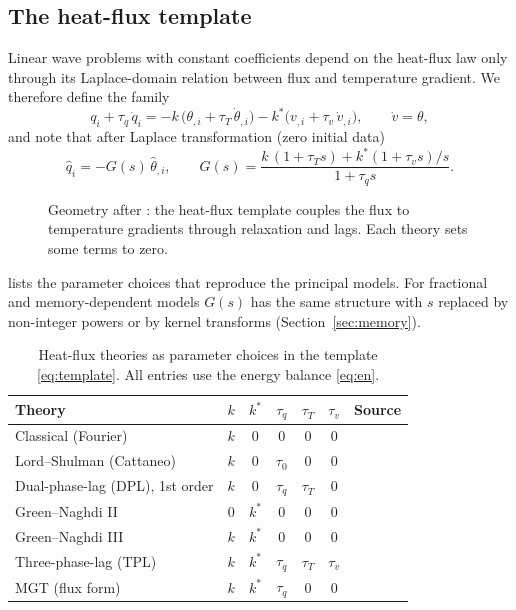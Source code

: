 \subsection{The heat-flux template}\label{sec:framework-link}
Linear wave problems with constant coefficients depend on the heat-flux law only through its Laplace-domain relation between flux and temperature gradient. We therefore define the family
\begin{equation}
q_i+\tau_q\,\dot q_i=-k\,\bigl(\theta_{,i}+\tau_T\,\dot\theta_{,i}\bigr)-k^{*}\bigl(v_{,i}+\tau_v\,\dot v_{,i}\bigr),\qquad \dot v=\theta,\label{eq:template}
\end{equation}
and note that after Laplace transformation (zero initial data)
\begin{equation}
\hat q_i=-G(s)\,\hat\theta_{,i},\qquad
G(s)=\frac{k\,(1+\tau_Ts)+k^{*}(1+\tau_vs)/s}{1+\tau_qs}.\label{eq:G}
\end{equation}

\begin{figure}[t!]\centering\small

\caption{Geometry after \citep{Biot1956}: the heat-flux template couples the flux to temperature gradients through relaxation and lags. Each theory sets some terms to zero.}\label{fig:template}
\end{figure}

 lists the parameter choices that reproduce the principal models. For fractional and memory-dependent models $G(s)$ has the same structure with $s$ replaced by non-integer powers or by kernel transforms (Section~\ref{sec:memory}).

\begin{table}[ht]\centering\small
\caption{Heat-flux theories as parameter choices in the template \eqref{eq:template}. All entries use the energy balance \eqref{eq:en}.}\label{tab:param}
\begin{tabular}{@{}lccccc l@{}}\toprule
Theory & $k$ & $k^*$ & $\tau_q$ & $\tau_T$ & $\tau_v$ & Source\\\midrule
Classical (Fourier) & $k$ & 0 & 0 & 0 & 0 & \citep{Biot1956}\\
Lord--Shulman (Cattaneo) & $k$ & 0 & $\tau_0$ & 0 & 0 & \citep{Lord1967,Cattaneo1948,Vernotte1958}\\
Dual-phase-lag (DPL), 1st order & $k$ & 0 & $\tau_q$ & $\tau_T$ & 0 & \citep{Tzou1995,Tzou1997}\\
Green--Naghdi II & 0 & $k^*$ & 0 & 0 & 0 & \citep{Green1993}\\
Green--Naghdi III & $k$ & $k^*$ & 0 & 0 & 0 & \citep{Green1991}\\
Three-phase-lag (TPL) & $k$ & $k^*$ & $\tau_q$ & $\tau_T$ & $\tau_v$ & \citep{RoyChoudhuri2007}\\
MGT (flux form) & $k$ & $k^*$ & $\tau_q$ & 0 & 0 & \citep{Quintanilla2019}\\\bottomrule
\end{tabular}
\end{table}


